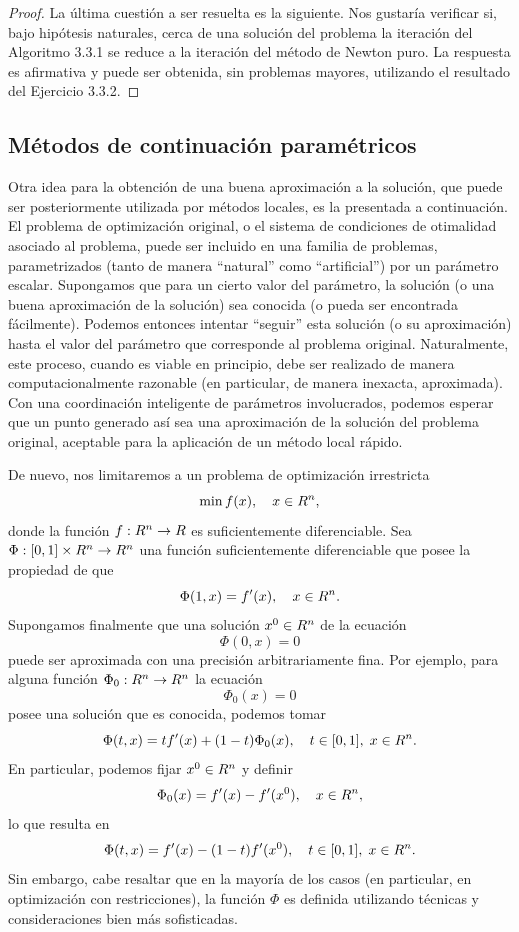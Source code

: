\begin{proof}
    La última cuestión a ser resuelta es la siguiente. Nos gustaría verificar si, bajo hipótesis naturales, cerca de una solución del problema la iteración del Algoritmo 3.3.1 se reduce a la iteración del método de Newton puro. La respuesta es afirmativa y puede ser obtenida, sin problemas mayores, utilizando el resultado del Ejercicio 3.3.2.
\end{proof}

\subsection{Métodos de continuación paramétricos}\label{v2:sec:3.3.3}

Otra idea para la obtención de una buena aproximación a la solución, que puede ser posteriormente utilizada por métodos locales, es la presentada a continuación. El problema de optimización original, o el sistema de condiciones de otimalidad asociado al problema, puede ser incluido en una familia de problemas, parametrizados (tanto de manera ``natural'' como ``artificial'') por un parámetro escalar. Supongamos que para un cierto valor del parámetro, la solución (o una buena aproximación de la solución) sea conocida (o pueda ser encontrada fácilmente). Podemos entonces intentar ``seguir'' esta solución (o su aproximación) hasta el valor del parámetro que corresponde al problema original. Naturalmente, este proceso, cuando es viable en principio, debe ser realizado de manera computacionalmente razonable (en particular, de manera inexacta, aproximada). Con una coordinación inteligente de parámetros involucrados, podemos esperar que un punto generado así sea una aproximación de la solución del problema original, aceptable para la aplicación de un método local rápido.

De nuevo, nos limitaremos a un problema de optimización irrestricta
\begin{equation}
    \min f(x), \quad x \in R^n,
    \label{v2:eq:3.104}
\end{equation}
donde la función $f : R^n \to R$ es suficientemente diferenciable. Sea $\Phi : [0, 1] \times R^n \to R^n$ una función suficientemente diferenciable que posee la propiedad de que
\[
    \Phi(1, x) = f'(x), \quad x \in R^n.
\]
Supongamos finalmente que una solución $x^0 \in R^n$ de la ecuación
\begin{equation}
    \Phi(0, x) = 0
    \label{v2:eq:3.105}
\end{equation}
puede ser aproximada con una precisión arbitrariamente fina. Por ejemplo, para alguna función $\Phi_0 : R^n \to R^n$ la ecuación
\[
    \Phi_0(x) = 0
\]
posee una solución que es conocida, podemos tomar
\[
    \Phi(t, x) = t f'(x) + (1-t) \Phi_0(x), \quad t \in [0, 1], \; x \in R^n.
\]
En particular, podemos fijar $x^0 \in R^n$ y definir
\[
    \Phi_0(x) = f'(x) - f'(x^0), \quad x \in R^n,
\]
lo que resulta en
\[
    \Phi(t, x) = f'(x) - (1-t) f'(x^0), \quad t \in [0, 1], \; x \in R^n.
\]
Sin embargo, cabe resaltar que en la mayoría de los casos (en particular, en optimización con restricciones), la función $\Phi$ es definida utilizando técnicas y consideraciones bien más sofisticadas.

